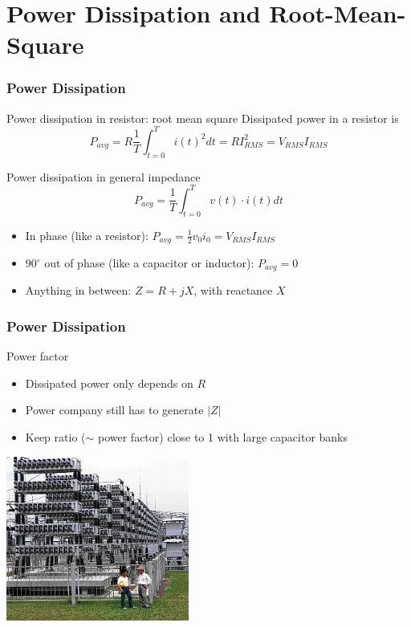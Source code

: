 \documentclass[beamer]{standalone}
\begin{document}
\section{Power Dissipation and Root-Mean-Square}
\begin{frame}
 \frametitle{Power Dissipation}
 \begin{block}{Power dissipation in resistor: root mean square}
  Dissipated power in a resistor is 
  \begin{equation*}
   P_{avg} = R \frac{1}{T} \int_{t=0}^T i(t)^2 dt = R I_{RMS}^2 = V_{RMS} I_{RMS}
  \end{equation*}
 \end{block}
 \begin{block}{Power dissipation in general impedance}
  \begin{equation*}
   P_{avg} = \frac{1}{T} \int_{t=0}^T v(t) \cdot i(t) dt
  \end{equation*}
  \begin{itemize}
   \item In phase (like a resistor): $P_{avg} = \frac{1}{2} v_0 i_0 = V_{RMS} I_{RMS}$
   \item $90^\circ$ out of phase (like a capacitor or inductor): $P_{avg} = 0$
   \item Anything in between: $Z = R + j X$, with reactance $X$
  \end{itemize}
 \end{block}
\end{frame}
\begin{frame}
 \frametitle{Power Dissipation}
 \begin{block}{Power factor}
  \begin{itemize}
   \item Dissipated power only depends on $R$
   \item Power company still has to generate $|Z|$
   \item Keep ratio ($\sim$ power factor) close to 1 with large capacitor banks
  \end{itemize}
 \end{block}
 \begin{center}
  \includegraphics[width=0.45\textwidth]{pics/capacitor_bank}
 \end{center}
\end{frame}
\end{document}
